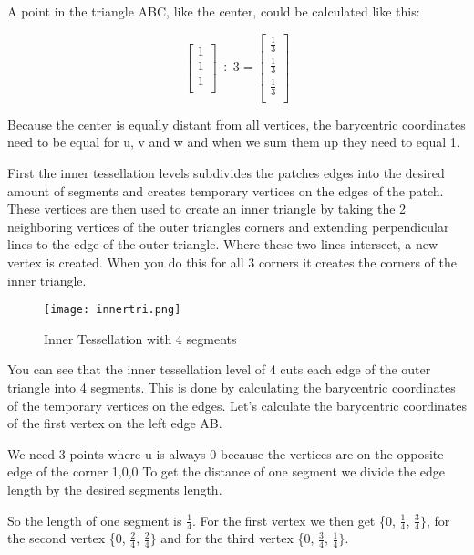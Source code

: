 \documentclass[12pt]{report} \usepackage{preamble}
\begin{document}
A point in the triangle ABC, like the center, could be calculated like this:

\[
	\begin{bmatrix}
		1 \\
		1 \\
		1 \\
	\end{bmatrix}
	\div
	3
	=
	\begin{bmatrix}
		\frac{1}{3} \\
		\frac{1}{3} \\
		\frac{1}{3} \\
	\end{bmatrix}
\]

Because the center is equally distant from all vertices, the barycentric coordinates need to be equal for u, v and w
and when we sum them up they need to equal 1.

First the inner tessellation levels subdivides the patches edges into the desired amount of segments and
creates temporary vertices on the edges of the patch. These vertices are then used to create an
inner triangle by taking the 2 neighboring vertices of the outer triangles corners and extending perpendicular
lines to the edge of the outer triangle. Where these two lines intersect, a new vertex is created. When you
do this for all 3 corners it creates the corners of the inner triangle. \cite{tessellation}

\begin{figure}[hbtp]
	\centering \texttt{[image: innertri.png]}
	\caption{Inner Tessellation with 4 segments}
	\cite{fig:inner-tessellation}
\end{figure} \FloatBarrier

You can see that the inner tessellation level of 4 cuts each edge of the outer triangle into 4 segments.
This is done by calculating the barycentric coordinates of the temporary vertices on the edges. Let's
calculate the barycentric coordinates of the first vertex on the left edge AB.

We need 3 points where u is always 0 because the vertices are on the opposite edge of the corner {1,0,0}
To get the distance of one segment we divide the edge length by the desired segments length.

So the length of one segment is \(\frac{1}{4}\).
For the first vertex we then get \{0, \(\frac{1}{4}\), \(\frac{3}{4}\}\), for the second
vertex \{0, \(\frac{2}{4}\), \(\frac{2}{4}\}\) and for the third vertex \{0, \(\frac{3}{4}\), \(\frac{1}{4}\}\).
\end{document}
